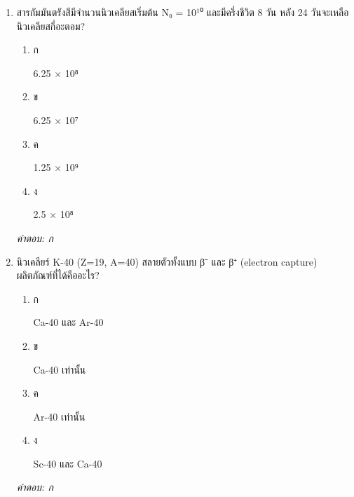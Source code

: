 \documentclass[12pt]{article}
\begin{document}
\begin{enumerate}[label=\arabic*., itemsep=0.5\baselineskip, topsep=0.5\baselineskip, leftmargin=*]
\item สารกัมมันตรังสีมีจำนวนนิวเคลียสเริ่มต้น N₀ = 10¹⁰ และมีครึ่งชีวิต 8 วัน หลัง 24 วันจะเหลือนิวเคลียสกี่อะตอม?
\begin{enumerate}[label=\alph*)., itemsep=0.3\baselineskip, topsep=0.3\baselineskip]
\item ก\ 
\begin{minipage}[t]{0.9\linewidth}
\raggedright 6.25 × 10⁸
\end{minipage}
\item ข\ 
\begin{minipage}[t]{0.9\linewidth}
\raggedright 6.25 × 10⁷
\end{minipage}
\item ค\ 
\begin{minipage}[t]{0.9\linewidth}
\raggedright 1.25 × 10⁹
\end{minipage}
\item ง\ 
\begin{minipage}[t]{0.9\linewidth}
\raggedright 2.5 × 10⁸
\end{minipage}
\end{enumerate}
\vspace{-0.3\baselineskip}
\begin{small}
\textit{คำตอบ: ก}
\end{small}

\item นิวเคลียร์ K-40 (Z=19, A=40) สลายตัวทั้งแบบ β⁻ และ β⁺ (electron capture) ผลิตภัณฑ์ที่ได้คืออะไร?
\begin{enumerate}[label=\alph*)., itemsep=0.3\baselineskip, topsep=0.3\baselineskip]
\item ก\ 
\begin{minipage}[t]{0.9\linewidth}
\raggedright Ca-40 และ Ar-40
\end{minipage}
\item ข\ 
\begin{minipage}[t]{0.9\linewidth}
\raggedright Ca-40 เท่านั้น
\end{minipage}
\item ค\ 
\begin{minipage}[t]{0.9\linewidth}
\raggedright Ar-40 เท่านั้น
\end{minipage}
\item ง\ 
\begin{minipage}[t]{0.9\linewidth}
\raggedright Sc-40 และ Ca-40
\end{minipage}
\end{enumerate}
\vspace{-0.3\baselineskip}
\begin{small}
\textit{คำตอบ: ก}
\end{small}


\end{enumerate}
\end{document}
